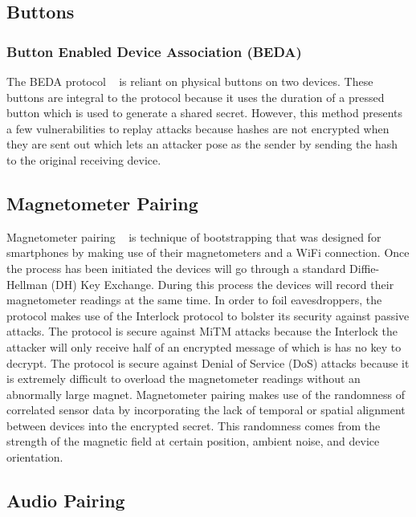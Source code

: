 \subsection{Buttons}
\subsubsection{Button Enabled Device Association (BEDA)}
The BEDA protocol ~\cite{soriente2007beda} is reliant on physical buttons on two devices.
These buttons are integral to the protocol because it uses the duration of a pressed button which is used to generate a shared secret.
However, this method presents a few vulnerabilities to replay attacks because hashes are not encrypted when they are sent out which lets an attacker pose as the sender by sending the hash to the original receiving device.



\subsection{Magnetometer Pairing}
Magnetometer pairing ~\cite{jin2014magpairing} is technique of bootstrapping that was designed for smartphones by making use of their magnetometers and a WiFi connection. Once the process has been initiated the devices will go through a standard Diffie-Hellman (DH) Key Exchange. During this process the devices will record their magnetometer readings at the same time. In order to foil eavesdroppers, the protocol makes use of the Interlock protocol to bolster its security against passive attacks. The protocol is secure against MiTM attacks because the Interlock the attacker will only receive half of an encrypted message of which is has no key to decrypt. The protocol is secure against Denial of Service (DoS) attacks because it is extremely difficult to overload the magnetometer readings without an abnormally large magnet. Magnetometer pairing makes use of the randomness of correlated sensor data by incorporating the lack of temporal or spatial alignment between devices into the encrypted secret. This randomness comes from the strength of the magnetic field at certain position, ambient noise, and device orientation.

\subsection{Audio Pairing}
